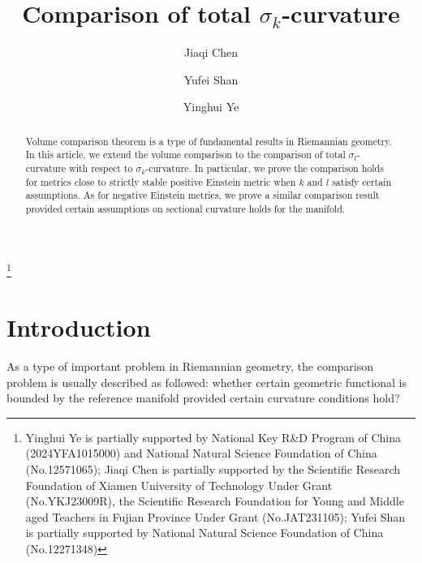 \documentclass[12pt]{amsart}
\numberwithin{equation}{section}
\begin{document}
\title{Comparison of total $\sigma_k$-curvature}

\author{Jiaqi Chen}
\address{School of Electrical Engineering and Automation, Xiamen University of Technology, Xiamen 361024, Fujian, P.R. China.}

\author{Yufei Shan}
\address{School of Mathematical Sciences, Shanghai Jiao Tong University,  Shanghai 200240, P.R. China.}

\author{Yinghui Ye}
\address{Department of Mathematics, Sun Yat-sen University, Guangzhou, Guangdong 510275, , P.R. China.}



\thanks{Yinghui Ye is partially supported by National Key R\&D Program of China (2024YFA1015000) and National Natural Science Foundation of China (No.12571065); Jiaqi Chen is partially supported by the Scientific Research Foundation of Xiamen University of Technology Under Grant (No.YKJ23009R), the Scientific Research Foundation for Young and Middle aged Teachers in Fujian Province Under Grant (No.JAT231105); Yufei Shan is partially supported by National Natural Science Foundation of China (No.12271348)}


\begin{abstract}
    Volume comparison theorem is a type of fundamental results in Riemannian geometry. In this article, we extend the volume comparison to the comparison of total $\sigma_l$-curvature with respect to $\sigma_k$-curvature. In particular, we prove the comparison holds for metrics close to strictly stable positive Einstein metric when $k$ and $l$ satisfy certain assumptions. As for negative Einstein metrics, we prove a similar comparison result provided certain assumptions on sectional curvature holds for the manifold.
\end{abstract}

\maketitle

\section{Introduction}\label{Section: 1}
As a type of important problem in Riemannian geometry, the comparison problem is usually described as followed: whether certain geometric functional is bounded by the reference manifold provided certain curvature conditions hold? 
\end{document}
